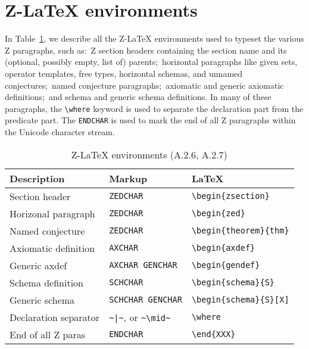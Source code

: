 \documentclass{article}
\newcommand{\smallcaption}[1]{{\small (#1)}}
\begin{document}
\section{Z-\LaTeX{} environments}\label{sec:latex-env}

In Table~\ref{tbl:latex-env}, we describe all the Z-\LaTeX{} environments used to
typeset the various Z paragraphs, such as:~Z section headers containing the section
name and its (optional, possibly empty, list of) parents;~horizontal paragraphs like given sets,
operator templates, free types, horizontal schemas, and unnamed conjectures;~named
conjecture paragraphs;~axiomatic and generic axiomatic definitions;~and schema and generic
schema definitions. In many of these paragraphs, the \verb|\where| keyword is used
to separate the declaration part from the predicate part. The \texttt{ENDCHAR}
is used to mark the end of all Z paragraphs within the Unicode character stream.
%
\begin{table}[ht]
\centering
\begin{tabular}{|l|l|l|}
    \hline
    \textbf{Description} & \textbf{Markup} & \textbf{\LaTeX} \\
    \hline
    Section header        & \texttt{ZEDCHAR}              & \verb|\begin{zsection}|      \\
    \hline
    Horizonal paragraph   & \texttt{ZEDCHAR}              & \verb|\begin{zed}|           \\
    \hline
    Named conjecture      & \texttt{ZEDCHAR}              & \verb|\begin{theorem}{thm}|  \\
    \hline
    Axiomatic definition  & \texttt{AXCHAR}               & \verb|\begin{axdef}|         \\
    \hline
    Generic axdef         & \texttt{AXCHAR GENCHAR}       & \verb|\begin{gendef}|        \\
    \hline
    Schema definition     & \texttt{SCHCHAR}              & \verb|\begin{schema}{S}|     \\
    \hline
    Generic schema        & \texttt{SCHCHAR GENCHAR}      & \verb|\begin{schema}{S}[X]|  \\
    \hline
    Declaration separator & \verb'~|~', or \verb|~\mid~|  & \verb|\where|                \\
    \hline
    End of all Z paras    & \texttt{ENDCHAR}              & \verb|\end{XXX}|             \\
    \hline
\end{tabular}
\caption{Z-\LaTeX{} environments \smallcaption{A.2.6, A.2.7}}\label{tbl:latex-env}
\end{table}
\end{document}
